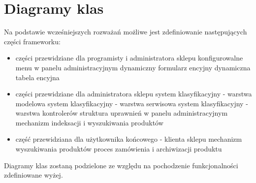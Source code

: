 \newpage
\section{Diagramy klas}

Na podstawie wcześniejszych rozważań możliwe jest zdefiniowanie następujących części frameworku: 
\begin{itemize}
	\item części przewidziane dla programisty i administratora sklepu
	\subitem konfigurowalne menu w panelu administracyjnym
	\subitem dynamiczny formularz encyjny
	\subitem dynamiczna tabela encyjna
	\item części przewidziane dla administratora sklepu
	\subitem system klasyfikacyjny - warstwa modelowa
	\subitem system klasyfikacyjny - warstwa serwisowa
	\subitem system klasyfikacyjny - warstwa kontrolerów
	\subitem struktura uprawnień w panelu administracyjnym
	\subitem mechanizm indeksacji i wyszukiwania produktów
	\item część przewidziana dla użytkownika końcowego - klienta sklepu
	\subitem mechanizm wyszukiwania produktów
	\subitem proces zamówienia i archiwizacji produktu
\end{itemize}
Diagramy klas zostaną podzielone ze względu na pochodzenie funkcjonalności zdefiniowane wyżej. 


